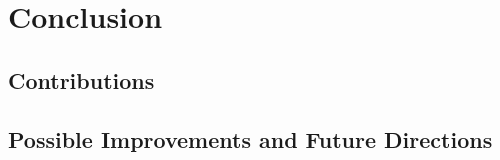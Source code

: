 \section{Conclusion}
\subsection{Contributions}


\subsection{Possible Improvements and Future Directions}
